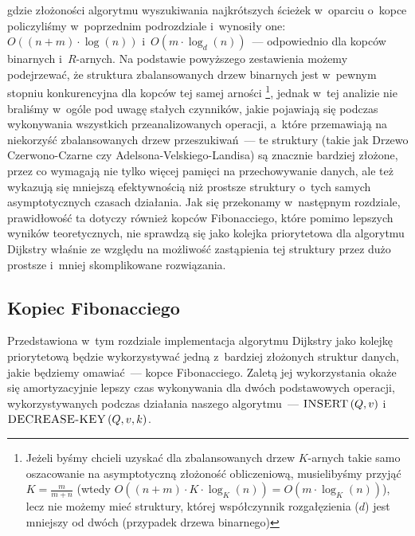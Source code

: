 gdzie złożoności algorytmu wyszukiwania najkrótszych ścieżek w~oparciu o~kopce policzyliśmy w~poprzednim podrozdziale i~wynosiły one: $ O \left( \left( n + m \right) \cdot \log \left( n \right) \right) $ i~$ O \left( m \cdot \log_{d} \left( n \right) \right) $~--- odpowiednio dla kopców binarnych i~$R$-arnych. Na podstawie powyższego zestawienia możemy podejrzewać, że struktura zbalansowanych drzew binarnych jest w~pewnym stopniu konkurencyjna dla kopców tej samej arności \footnote{Jeżeli byśmy chcieli uzyskać dla zbalansowanych drzew $K$-arnych takie samo oszacowanie na asymptotyczną złożoność obliczeniową, musielibyśmy przyjąć $K = \frac{m}{m+n}$ (wtedy $O \left( \left( n + m \right) \cdot K \cdot \log_{K} \left( n \right) \right) = O \left( m \cdot \log_{K} \left( n \right) \right) $), lecz nie możemy mieć struktury, której współczynnik rozgałęzienia ($d$) jest mniejszy od dwóch (przypadek drzewa binarnego)}, jednak w~tej analizie nie braliśmy w~ogóle pod uwagę stałych czynników, jakie pojawiają się podczas wykonywania wszystkich przeanalizowanych operacji, a~które przemawiają na niekorzyść zbalansowanych drzew przeszukiwań~--- te struktury (takie jak Drzewo Czerwono-Czarne czy Adelsona-Velskiego-Landisa) są znacznie bardziej złożone, przez co wymagają nie tylko więcej pamięci na przechowywanie danych, ale też wykazują się mniejszą efektywnością niż prostsze struktury o~tych samych asymptotycznych czasach działania. Jak się przekonamy w~następnym rozdziale, prawidłowość ta dotyczy również kopców Fibonacciego, które pomimo lepszych wyników teoretycznych, nie sprawdzą się jako kolejka priorytetowa dla algorytmu Dijkstry właśnie ze względu na możliwość zastąpienia tej struktury przez dużo prostsze i~mniej skomplikowane rozwiązania.

\subsection{Kopiec Fibonacciego}

Przedstawiona w~tym rozdziale implementacja algorytmu Dijkstry jako kolejkę priorytetową będzie wykorzystywać jedną z~bardziej złożonych struktur danych, jakie będziemy omawiać~--- kopce Fibonacciego. Zaletą jej wykorzystania okaże się amortyzacyjnie lepszy czas wykonywania dla dwóch podstawowych operacji, wykorzystywanych podczas działania naszego algorytmu~--- $\textrm{\textsc{INSERT}} \left( Q, v \right)$ i~$\textrm{\textsc{DECREASE-KEY}} \left( Q, v, k \right)$.


